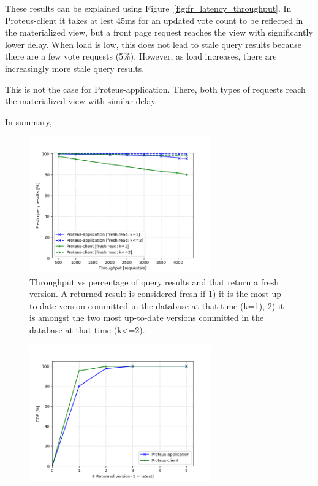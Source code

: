 These results can be explained using Figure~\ref{fig:fr_latency_throughput}.
In Proteus-client it takes at lest 45ms for an updated vote count to be reflected in the materialized view,
but a front page request reaches the view with significantly lower delay.
When load is low, this does not lead to stale query results because there are a few vote requests (5\%).
However, as load increases, there are increasingly more stale query results.

This is not the case for Proteus-application.
There, both types of requests reach the materialized view with similar delay.

\medskip
\noindent
In summary,

\begin{figure}
\centering
  \includegraphics[width=0.7\textwidth]{./figures/evaluation/fresh_reads_throughput.png}
  \caption{Throughput vs percentage of query results and that return a fresh version.
  A returned result is considered fresh if 1) it is the most up-to-date version committed in the database at that time (k=1),
  2) it is amongst the two most up-to-date versions committed in the database at that time (k<=2).}
  \label{fig:fresh_reads_throughput}
\end{figure}

\begin{figure}
\centering
  \includegraphics[width=0.7\textwidth]{./figures/evaluation/readV_cdf_throughput.png}
  \caption{}
  \label{fig:readV_cdf_throughput}
\end{figure}

